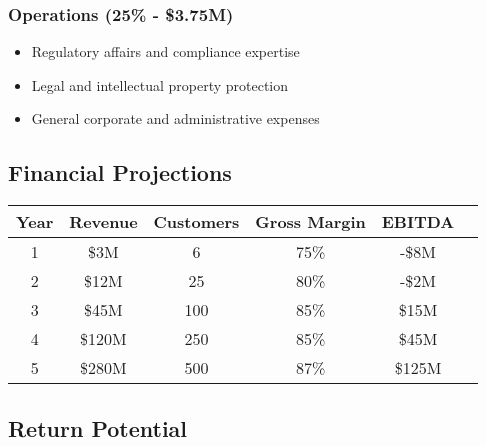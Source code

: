 \documentclass[12pt,a4paper]{article}
\begin{document}
\subsubsection{Operations (25\% - \$3.75M)}
\begin{itemize}
    \item Regulatory affairs and compliance expertise
    \item Legal and intellectual property protection
    \item General corporate and administrative expenses
\end{itemize}

\subsection{Financial Projections}

\begin{center}
\begin{tabular}{cccccc}
\toprule
\textbf{Year} & \textbf{Revenue} & \textbf{Customers} & \textbf{Gross Margin} & \textbf{EBITDA} \\
\midrule
1 & \$3M & 6 & 75\% & -\$8M \\
2 & \$12M & 25 & 80\% & -\$2M \\
3 & \$45M & 100 & 85\% & \$15M \\
4 & \$120M & 250 & 85\% & \$45M \\
5 & \$280M & 500 & 87\% & \$125M \\
\bottomrule
\end{tabular}
\end{center}

\begin{center}
\end{center}

\subsection{Return Potential}
\end{document}
